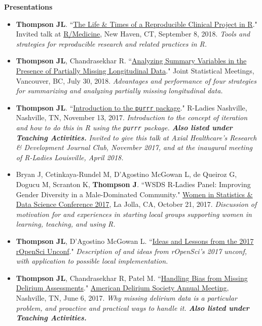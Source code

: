 \documentclass[5pt]{article}
\begin{document}
\noindent \textbf{Presentations}
\begin{itemize}
\item \textbf{Thompson JL}. ``\href{https://jenthompson.me/slides/rmedicine2018/rmedicine2018}{The Life \& Times of a Reproducible Clinical Project in R}." Invited talk at \href{https://r-medicine.com}{R/Medicine}, New Haven, CT, September 8, 2018. \emph{Tools and strategies for reproducible research and related practices in R.}
\item \textbf{Thompson JL}, Chandrasekhar R. ``\href{https://jenthompson.me/slides/jsm2018/jsm2018}{Analyzing Summary Variables in the Presence of Partially Missing Longitudinal Data}." Joint Statistical Meetings, Vancouver, BC, July 30, 2018. \emph{Advantages and performance of four strategies for summarizing and analyzing partially missing longitudinal data.}
\item \textbf{Thompson JL}. ``\href{github.com/jenniferthompson/RLadiesIntroToPurrr}{Introduction to the \texttt{purrr} package}." R-Ladies Nashville, Nashville, TN, November 13, 2017. \emph{Introduction to the concept of iteration and how to do this in R using the \texttt{purrr} package. \textbf{Also listed under Teaching Activities.}}
\indent \emph{Invited to give this talk at Axial Healthcare's Research \& Development Journal Club, November 2017, and at the inaugural meeting of R-Ladies Louisville, April 2018.}
\item Bryan J, Cetinkaya-Rundel M, D'Agostino McGowan L, de Queiroz G, Dogucu M, Scranton K, \textbf{Thompson J}. ``WSDS R-Ladies Panel: Improving Gender Diversity in a Male-Dominated Community." \href{https://ww2.amstat.org/meetings/wsds/2017/onlineprogram/AbstractDetails.cfm?AbstractID=303812}{Women in Statistics \& Data Science Conference 2017}, La Jolla, CA, October 21, 2017. \emph{Discussion of motivation for and experiences in starting local groups supporting women in learning, teaching, and using R.}
\item \textbf{Thompson JL}, D'Agostino McGowan L. ``\href{https://tinyurl.com/vubiostat-runconf17}{Ideas and Lessons from the 2017 rOpenSci Unconf}." \emph{Description of and ideas from rOpenSci's 2017 unconf, with application to possible local implementation.}
\item \textbf{Thompson JL}, Chandrasekhar R, Patel M. ``\href{https://github.com/jenniferthompson/ADS2017}{Handling Bias from Missing Delirium Assessments}." \href{http://www.cvent.com/events/7th-annual-american-delirium-society/event-summary-cd74fed5605a4918bc0a9c0e28561bac.aspx}{American Delirium Society Annual Meeting}, Nashville, TN, June 6, 2017. \emph{Why missing delirium data is a particular problem, and proactive and practical ways to handle it. \textbf{Also listed under Teaching Activities.}}

\end{itemize}
\end{document}
